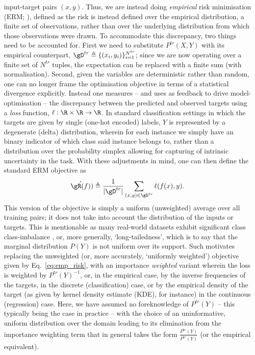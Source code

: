input-target pairs \( (x, y) \). 
%
Thus, we are instead doing \emph{empirical} risk minimisation (ERM; \cite{vapnik1991principles}),
defined as the risk is instead defined over the empirical distribution, a finite set of
observations, rather than over the underlying distribution from which those observations were
drawn.
To accommodate this discrepancy, two things need to be accounted for. 
%
First we need to  substitute \( P^{tr}(X, Y) \) with its empirical counterpart, \( \gD^{tr}
\triangleq \{(x_i, y_i) \}_{i=1}^{N^{tr}} \); since we are now operating over a finite set of \(
N^{tr} \) tuples, the expectation can be replaced with a finite sum (with normalisation). 
%
Second, given the variables are deterministic rather than random, one can no longer frame the
optimisation objective in terms of a statistical divergence explicitly. 
%
Instead one measures -- and uses as feedback to drive model-optimisation -- the discrepancy between
the predicted and observed targets using a \emph{loss} function, \( \ell: \R \times \R \to \R \). 
%
In standard classification settings in which the targets are given by single (one-hot encoded)
labels, \( Y \) is represented by a degenerate (delta) distribution, wherein for each instance we
simply have an binary indicator of which class said instance belongs to, rather than a distribution
over the probability simplex allowing for capturing of intrinsic uncertainty in the task.
%
With these adjustments in mind, one can then define the standard ERM objective as
\begin{equation*}\label{eq:emp_risk} \hat{\gR(f)}) \triangleq \frac{1}{|\gD^{tr}|}  \sum_{(x, y)
\in \gD^{tr}} \ell (f(x), y). \end{equation*}
%
This version of the objective is simply a uniform (unweighted) average over all training pairs; it
does not take into account the distribution of the inputs or targets.
%
This is mentionable as many real-world datasets exhibit significant class class-imbalance
\citep{zhu2014capturing, van2017devil}, or, more generally, `long-tailedness', which is to say that
the marginal distribution \( P(Y) \) is not uniform over its support.
Such motivates replacing the unweighted (or, more accurately, `uniformly weighted') objective given
by Eq.~\ref{eq:emp_risk}, with an importance  \emph{weighted} variant wherein the loss is weighted
by \( P^{tr}(Y)^{-1} \), or, in the empirical case, by the inverse frequencies of the targets, in
the discrete (classification) case, or by the empirical density of the target (as given by kernel
density estimate (KDE), for instance) in the continuous (regression) case.
Here, we have assumed no foreknowledge of \( P^{te}(Y) \) -- this typically being the case in
practice -- with the choice of an uninformative, uniform distribution over the domain leading to
its elimination from the importance weighting term that in general takes the form \( \frac{
P^{te}(Y) }{ P^{tr}(Y) } \) (or the empirical equivalent).

